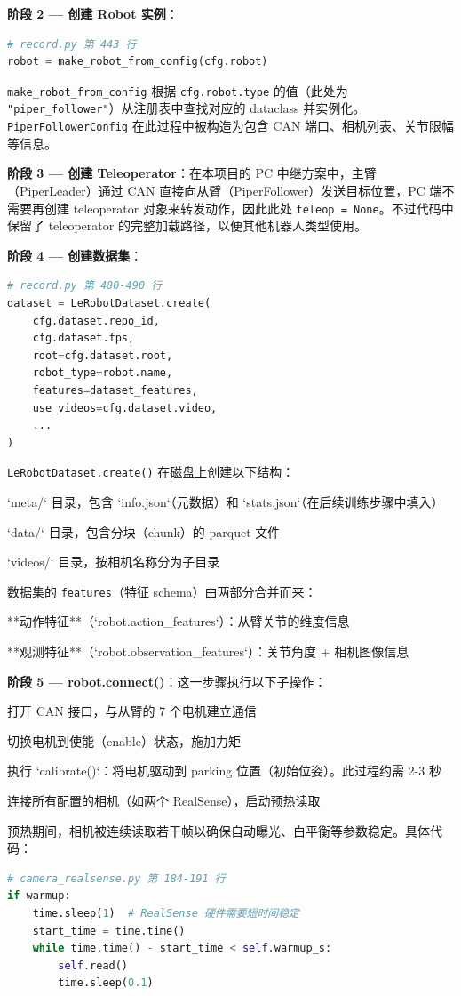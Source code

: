 \documentclass[UTF8,a4paper,11pt]{ctexart}
\begin{document}
{\textbf{阶段 2 — 创建 Robot 实例}：
\begin{lstlisting}[language=python]
# record.py 第 443 行
robot = make_robot_from_config(cfg.robot)
\end{lstlisting}
\texttt{make_robot_from_config} 根据 \texttt{cfg.robot.type} 的值（此处为 \texttt{"piper_follower"}）从注册表中查找对应的 dataclass 并实例化。\texttt{PiperFollowerConfig} 在此过程中被构造为包含 CAN 端口、相机列表、关节限幅等信息。

\textbf{阶段 3 — 创建 Teleoperator}：在本项目的 PC 中继方案中，主臂（PiperLeader）通过 CAN 直接向从臂（PiperFollower）发送目标位置，PC 端不需要再创建 teleoperator 对象来转发动作，因此此处 \texttt{teleop = None}。不过代码中保留了 teleoperator 的完整加载路径，以便其他机器人类型使用。

\textbf{阶段 4 — 创建数据集}：
\begin{lstlisting}[language=python]
# record.py 第 480-490 行
dataset = LeRobotDataset.create(
    cfg.dataset.repo_id,
    cfg.dataset.fps,
    root=cfg.dataset.root,
    robot_type=robot.name,
    features=dataset_features,
    use_videos=cfg.dataset.video,
    ...
)
\end{lstlisting}
\texttt{LeRobotDataset.create()} 在磁盘上创建以下结构：
\item `meta/` 目录，包含 `info.json`（元数据）和 `stats.json`（在后续训练步骤中填入）
\item `data/` 目录，包含分块（chunk）的 parquet 文件
\item `videos/` 目录，按相机名称分为子目录

数据集的 \texttt{features}（特征 schema）由两部分合并而来：
\item[1] **动作特征**（`robot.action_features`）：从臂关节的维度信息
\item[2] **观测特征**（`robot.observation_features`）：关节角度 + 相机图像信息

\textbf{阶段 5 — robot.connect()}：这一步骤执行以下子操作：
\item[1] 打开 CAN 接口，与从臂的 7 个电机建立通信
\item[2] 切换电机到使能（enable）状态，施加力矩
\item[3] 执行 `calibrate()`：将电机驱动到 parking 位置（初始位姿）。此过程约需 2-3 秒
\item[4] 连接所有配置的相机（如两个 RealSense），启动预热读取

预热期间，相机被连续读取若干帧以确保自动曝光、白平衡等参数稳定。具体代码：
\begin{lstlisting}[language=python]
# camera_realsense.py 第 184-191 行
if warmup:
    time.sleep(1)  # RealSense 硬件需要短时间稳定
    start_time = time.time()
    while time.time() - start_time < self.warmup_s:
        self.read()
        time.sleep(0.1)
\end{lstlisting}

}
\end{document}
